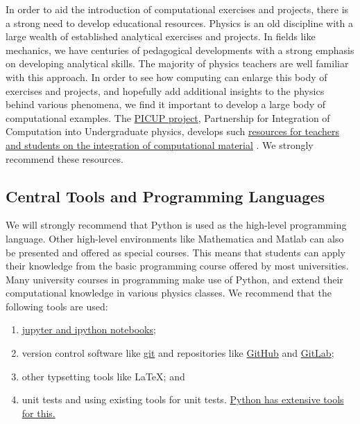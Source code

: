 \documentclass[graybox,envcountchap,sectrefs]{svmult}
\begin{document}
In order to aid the introduction of computational exercises and
projects, there is a strong need to develop educational resources.
Physics is an old discipline with a large wealth of established analytical exercises and
projects. In fields like mechanics, we have centuries of pedagogical
developments with a strong emphasis on developing analytical
skills. The majority of physics teachers are well familiar with this approach.
In order to see how computing  can enlarge this body of exercises
and projects, and hopefully add additional insights to the physics
behind various phenomena, we find it important to develop a large body
of computational examples.
The
\href{{http://www.compadre.org/picup/}}{PICUP project}, Partnership for
Integration of Computation into Undergraduate physics, develops such
\href{{http://www.compadre.org/PICUP/resources/}}{resources for teachers and students on the integration of
computational material} \cite{PICUP}.
We strongly recommend these resources.

\subsection{Central Tools and Programming Languages}
We will strongly recommend that Python is used as the high-level
 programming language. Other high-level environments like Mathematica
 and Matlab can also be presented and offered as special courses. This
 means that students can apply their knowledge from the basic programming course offered by most universities.
Many university courses in programming  make use of Python, and extend their computational knowledge in
 various physics classes. We recommend  that the following
 tools are used:
\begin{enumerate}
\item \href{{http://jupyter.org/}}{jupyter and ipython notebooks};

\item version control software like \href{{https://git-scm.com/}}{git} and repositories like \href{{https://github.com/}}{GitHub} and \href{{https://gitlab.com/}}{GitLab};

\item other typsetting tools like {\LaTeX}; and

\item unit tests and using existing tools for unit tests. \href{{https://docs.python.org/2/library/unittest.html}}{Python has extensive tools for this.}
\end{enumerate}
\end{document}
